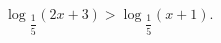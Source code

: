 \begin{ex}[type=inequality]
	\begin{condition}
		$ \log$\tiny$_{\dfrac{1}{5}}$\normalsize$(2x + 3)>\log$\tiny$_{\dfrac{1}{5}}$\normalsize$(x + 1) .$
	\end{condition}
\end{ex}